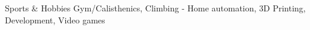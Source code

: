 

\begin{cvskills}


  \cvskill
    {Sports \& Hobbies} %
    {Gym/Calisthenics, Climbing - Home automation, 3D Printing, Development, Video games} %

\end{cvskills}
